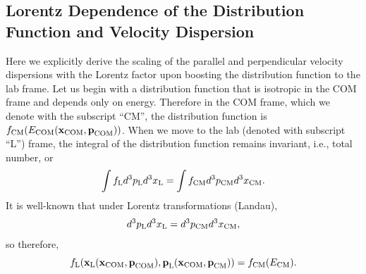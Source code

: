 \documentclass[usenatbib,iop,apj,numberedappendix]{aeb_emulateapj_2015}
\newcommand\bmath[1] {\mbox{\boldmath$\rm #1$}}
\newcommand{\pmom}{\ensuremath{\bmath{p}}}
\newcommand{\ppos}{\ensuremath{\bmath{x}}}
\newcommand{\fLAB}{\ensuremath{f_{\rm L}}}
\newcommand{\fCM}{\ensuremath{f_{\rm CM}}}
\newcommand{\dVLAB}{\ensuremath{d^3p_{\rm L} d^3x_{\rm L}}}
\newcommand{\dVCM}{\ensuremath{d^3p_{\rm CM} d^3x_{\rm CM}}}
\begin{document}
\begin{appendix}

\section{Lorentz Dependence of the Distribution Function and Velocity Dispersion}
\label{sec:lorentz}

Here we explicitly derive the scaling of the parallel and
perpendicular velocity dispersions with the Lorentz factor upon boosting the
distribution function to the lab frame. Let us begin with a distribution
function that is isotropic in the COM frame and depends only on energy.
Therefore in the COM frame, which we denote with the subscript ``CM'', the distribution
function is  $\fCM(E_{\rm COM}(\ppos_{\rm COM},\pmom_{\rm COM}))$.  When we move to the lab
(denoted with subscript ``L'') frame, the integral of the distribution function remains invariant,
i.e., total number, or
\begin{equation}
 \int \fLAB \dVLAB = \int \fCM \dVCM.
\end{equation}
It is well-known that under Lorentz transformations (Landau), 
\begin{equation}
 \dVLAB = \dVCM,
\end{equation}
so therefore,
\begin{equation}
  \fLAB(\ppos_{\rm L}(\ppos_{\rm COM},\pmom_{\rm COM}),\pmom_{\rm L}(\ppos_{\rm COM},\pmom_{\rm CM})) = \fCM(E_{\rm CM}).
\end{equation}


\end{appendix}
\end{document}
